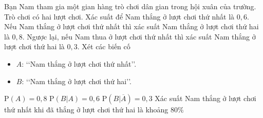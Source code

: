 \begin{ex}%
	Bạn Nam tham gia một gian hàng trò chơi dân gian trong hội xuân của trường. Trò chơi có hai lượt chơi. Xác suất để Nam thắng ở lượt chơi thứ nhất là $0{,}6$. Nếu Nam thắng ở lượt chơi thứ nhất thì xác suất Nam thắng ở lượt chơi thứ hai là $0{,}8 $. Ngược lại, nếu Nam thua ở lượt chơi thứ nhất thì xác suất Nam thắng ở lượt chơi thứ hai là $0{,}3$. Xét các biến cố
	\begin{itemize}
	\item $A$: \lq\lq  Nam thắng ở lượt chơi thứ nhất\rq\rq.
	\item $B$: \lq\lq  Nam thắng ở lượt chơi thứ hai\rq\rq.
	\end{itemize}
	\choiceTF
	{ $\mathrm{P}(A)=0{,}8$}
	{ $\mathrm{P}\left(B|A\right) = 0{,}6$}
	{\True $\mathrm{P}\left(B|\overline{A}\right) = 0{,}3$}
	{\True Xác suất Nam thắng ở lượt chơi thứ nhất khi đã thắng ở lượt chơi thứ hai là khoảng $80 \%$}
\end{ex}

